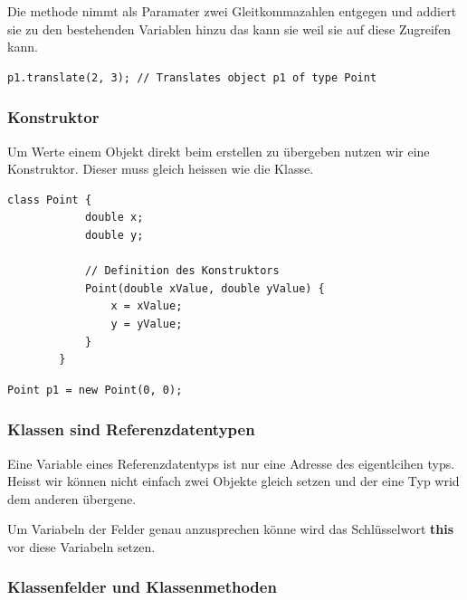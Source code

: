 \documentclass[12pt]{article}
\begin{document}
        Die methode nimmt als Paramater zwei Gleitkommazahlen entgegen und addiert sie zu den 
        bestehenden Variablen hinzu das kann sie weil sie auf diese Zugreifen kann. 


        \begin{lstlisting}[caption=ausführen methode]
    p1.translate(2, 3); // Translates object p1 of type Point
        \end{lstlisting}

        \subsubsection*{Konstruktor}

        Um Werte einem Objekt direkt beim erstellen zu übergeben nutzen wir eine Konstruktor. Dieser muss 
        gleich heissen wie die Klasse. 

        \begin{lstlisting}[caption=Konstruktor]
        class Point {
            double x;
            double y;

            // Definition des Konstruktors
            Point(double xValue, double yValue) {
                x = xValue;
                y = yValue;
            }
        }
        \end{lstlisting}

        \begin{lstlisting}[caption=nutzen Konstruktor]
            Point p1 = new Point(0, 0);
        \end{lstlisting}


        \subsubsection*{Klassen sind Referenzdatentypen}
        Eine Variable eines Referenzdatentyps ist nur eine Adresse des eigentlcihen typs. Heisst wir können nicht einfach zwei Objekte gleich setzen und der eine 
        Typ wrid dem anderen übergene. 

        Um Variabeln der Felder genau anzusprechen könne wird das Schlüsselwort \textbf{this} vor diese Variabeln setzen.

        \subsubsection*{Klassenfelder und Klassenmethoden}
\end{document}
